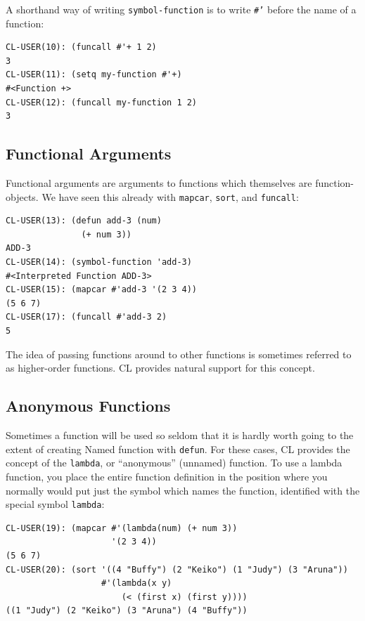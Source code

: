A shorthand way of writing \texttt{symbol-function} is to write \texttt{\#'} before the name of a function:

\begin{verbatim}
CL-USER(10): (funcall #'+ 1 2)
3
CL-USER(11): (setq my-function #'+)
#<Function +>
CL-USER(12): (funcall my-function 1 2)
3
\end{verbatim}

\subsection{Functional Arguments}

Functional arguments are arguments to functions which themselves are function-objects.
We have seen this already with \texttt{mapcar}, \texttt{sort}, and \texttt{funcall}:

\begin{verbatim}
CL-USER(13): (defun add-3 (num)
               (+ num 3))
ADD-3
CL-USER(14): (symbol-function 'add-3)
#<Interpreted Function ADD-3>
CL-USER(15): (mapcar #'add-3 '(2 3 4))
(5 6 7)
CL-USER(17): (funcall #'add-3 2)
5
\end{verbatim}

The idea of passing functions around to other functions is sometimes referred to as higher-order
functions. CL provides natural support for this concept.

\subsection{Anonymous Functions}

Sometimes a function will be used so seldom that it is hardly worth going to the extent
of creating Named function with \texttt{defun}. For these cases, CL provides the concept of the
\texttt{lambda}, or ``anonymous'' (unnamed) function. To use a lambda function, you place the
entire function definition in the position where you normally would put just the symbol
which names the function, identified with the special symbol \texttt{lambda}:

\begin{verbatim}
CL-USER(19): (mapcar #'(lambda(num) (+ num 3))
                     '(2 3 4))
(5 6 7)
CL-USER(20): (sort '((4 "Buffy") (2 "Keiko") (1 "Judy") (3 "Aruna"))
                   #'(lambda(x y)
                       (< (first x) (first y))))
((1 "Judy") (2 "Keiko") (3 "Aruna") (4 "Buffy"))
\end{verbatim}

